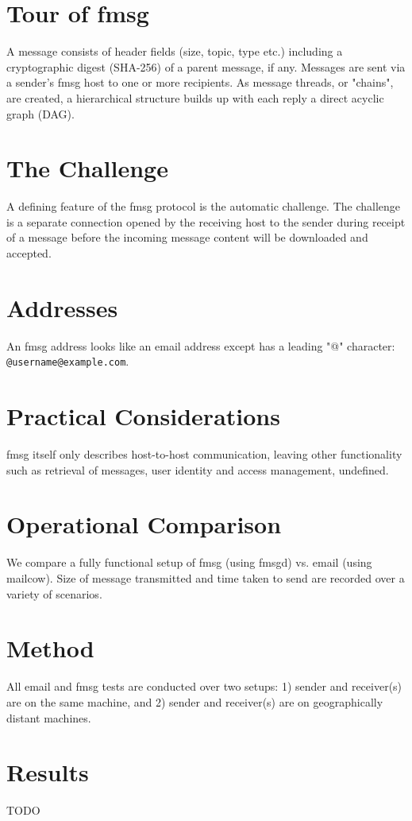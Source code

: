\documentclass[11pt, a4paper]{article}
\begin{document}
\section{Tour of fmsg}
A message consists of header fields (size, topic, type etc.) including a cryptographic digest (SHA-256) of a parent message, if any. Messages are sent via a sender's fmsg host to one or more recipients. As message threads, or "chains", are created, a hierarchical structure builds up with each reply a direct acyclic graph (DAG).

\section{The Challenge}
A defining feature of the fmsg protocol is the automatic challenge. The challenge is a separate connection opened by the receiving host to the sender during receipt of a message before the incoming message content will be downloaded and accepted.

\section{Addresses}
An fmsg address looks like an email address except has a leading "@" character: \texttt{@username@example.com}.

\section{Practical Considerations}
fmsg itself only describes host-to-host communication, leaving other functionality such as retrieval of messages, user identity and access management, undefined.

\section{Operational Comparison}
We compare a fully functional setup of fmsg (using fmsgd) vs. email (using mailcow). Size of message transmitted and time taken to send are recorded over a variety of scenarios.

\section{Method}
All email and fmsg tests are conducted over two setups: 1) sender and receiver(s) are on the same machine, and 2) sender and receiver(s) are on geographically distant machines.

\section{Results}
TODO
\end{document}
